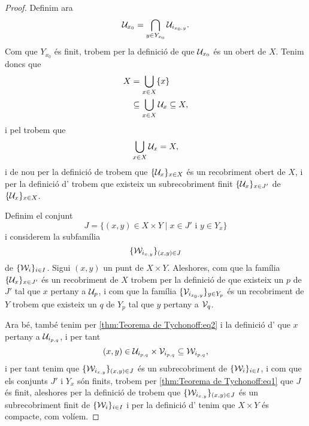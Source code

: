 \documentclass[../Apunts.tex]{subfiles}
\begin{document}
\begin{theorem}
\begin{proof}
			Definim ara
			\begin{equation}
				\label{thm:Teorema de Tychonoff:eq2}
				\mathcal{U}_{x_{0}}=\bigcap_{y\in Y_{x_{0}}}\mathcal{U}_{i_{x_{0},y}}.
			\end{equation}
			Com que \(Y_{x_{0}}\) és finit, trobem per la definició de  que \(\mathcal{U}_{x_{0}}\) és un obert de \(X\). Tenim doncs que
			\begin{align*}
				X&=\bigcup_{x\in X}\{x\} \\
				&\subseteq\bigcup_{x\in X}\mathcal{U}_{x}\subseteq X,
			\end{align*}
			i pel  trobem que
			\[\bigcup_{x\in X}\mathcal{U}_{x}=X,\]
			i de nou per la definició de  trobem que \(\{\mathcal{U}_{x}\}_{x\in X}\) és un recobriment obert de \(X\), i per la definició d' trobem que existeix un subrecobriment finit \(\{\mathcal{U}_{x}\}_{x\in J'}\) de \(\{\mathcal{U}_{x}\}_{x\in X}\).
			
			Definim el conjunt
			\begin{equation}
				\label{thm:Teorema de Tychonoff:eq1}
				J=\{(x,y)\in X\times Y\mid x\in J'\text{ i }y\in Y_{x}\}
			\end{equation}
			i considerem la subfamília
			\[\{\mathcal{W}_{i_{x,y}}\}_{(x,y)\in J}\]
			de \(\{\mathcal{W}_{i}\}_{i\in I}\). Sigui \((x,y)\) un punt de \(X\times Y\). Aleshores, com que la família \(\{\mathcal{U}_{x}\}_{x\in J'}\) és un recobriment de \(X\) trobem per la definició de  que existeix un \(p\) de \(J'\) tal que \(x\) pertany a \(\mathcal{U}_{p}\), i com que la família \(\{\mathcal{V}_{i_{x_{0},y}}\}_{y\in Y_{p}}\) és un recobriment de \(Y\) trobem que existeix un \(q\) de \(Y_{p}\) tal que \(y\) pertany a \(\mathcal{V}_{q}\).
			
			Ara bé, també tenim per \eqref{thm:Teorema de Tychonoff:eq2} i la definició d' que \(x\) pertany a \(\mathcal{U}_{i_{p,q}}\), i per tant
			\[(x,y)\in\mathcal{U}_{i_{p,q}}\times\mathcal{V}_{i_{p,q}}\subseteq\mathcal{W}_{i_{p,q}},\]
			i per tant tenim que \(\{\mathcal{W}_{i_{x,y}}\}_{(x,y)\in J}\) és un subrecobriment de \(\{\mathcal{W}_{i}\}_{i\in I}\), i com que els conjunts \(J'\) i \(Y_{x}\) són finits, trobem per \eqref{thm:Teorema de Tychonoff:eq1} que \(J\) és finit, aleshores per la definició de  trobem que \(\{\mathcal{W}_{i_{x,y}}\}_{(x,y)\in J}\) és un subrecobriment finit de \(\{\mathcal{W}_{i}\}_{i\in I}\) i per la definició d' tenim que \(X\times Y\) és compacte, com volíem.
		\end{proof}
	\end{theorem}
\end{document}
